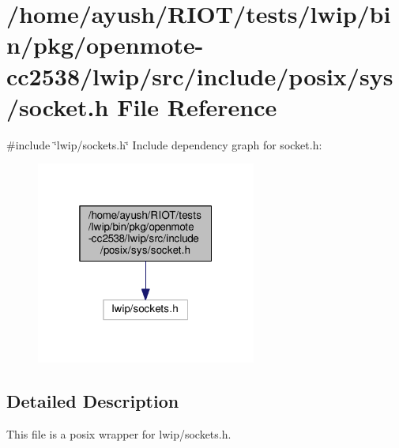 \hypertarget{openmote-cc2538_2lwip_2src_2include_2posix_2sys_2socket_8h}{}\section{/home/ayush/\+R\+I\+O\+T/tests/lwip/bin/pkg/openmote-\/cc2538/lwip/src/include/posix/sys/socket.h File Reference}
\label{openmote-cc2538_2lwip_2src_2include_2posix_2sys_2socket_8h}
{\ttfamily \#include \char`\"{}lwip/sockets.\+h\char`\"{}}\newline
Include dependency graph for socket.\+h\+:
\nopagebreak
\begin{figure}[H]
\begin{center}
\leavevmode
\includegraphics[width=205pt]{openmote-cc2538_2lwip_2src_2include_2posix_2sys_2socket_8h__incl}
\end{center}
\end{figure}


\subsection{Detailed Description}
This file is a posix wrapper for lwip/sockets.\+h. 